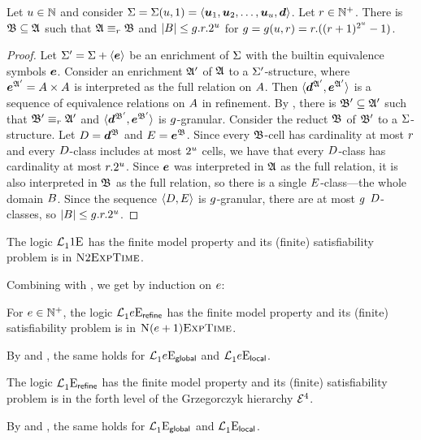 \begin{remark}\label{rem:monadic-1}
Let $u \in \mathbb{N}$ and consider $\mathrm{\Sigma} = \mathrm{\Sigma}(u,1) =
\left\langle \bm{u}_{1},\bm{u}_{2},\dots,\bm{u}_{u},\bm{d} \right\rangle$. Let $r \in \mathbb{N}^{+}$.
There is $\mathfrak{B} \subseteq \mathfrak{A}$ such that $\mathfrak{A} \equiv_{r} \mathfrak{B}$ and
$\left|B\right| \leq g.r.2^u$ for $g = g(u, r) =
r.((r+1)^{2^u}-1)$.
\end{remark}
\begin{proof}
Let $\mathrm{\Sigma'} = \mathrm{\Sigma} + \left\langle \bm{e} \right\rangle$ be an enrichment of $\mathrm{\Sigma}$ with the builtin
equivalence symbols $\bm{e}$. Consider an enrichment $\mathfrak{A'}$ of $\mathfrak{A}$ to a
$\mathrm{\Sigma'}$-structure, where $\bm{e}^{\mathfrak{A'}} = {A\times A}$ is interpreted as the
full relation on $A$. Then $\langle \bm{d}^{\mathfrak{A'}}, \bm{e}^{\mathfrak{A'}} \rangle$ is a
sequence of equivalence relations on $A$ in refinement.
By , there is $\mathfrak{B'} \subseteq \mathfrak{A'}$ such that
$\mathfrak{B'} \equiv_{r} \mathfrak{A'}$ and $\langle \bm{d}^{\mathfrak{B'}},\bm{e}^{\mathfrak{B'}} \rangle$ is
$g$-granular.
Consider the reduct $\mathfrak{B}$ of $\mathfrak{B'}$ to a
$\mathrm{\Sigma}$-structure. Let $D = \bm{d}^{\mathfrak{B}}$ and $E = \bm{e}^{\mathfrak{B}}$.
Since every $\mathfrak{B}$-cell has
cardinality at most $r$ and every $D$-class includes at most $2^u$
cells, we have that every $D$-class has cardinality at most $r.2^u$.
Since $\bm{e}$ was interpreted in $\mathfrak{A}$ as the full relation, it is also
interpreted in $\mathfrak{B}$ as the full relation, so there is a single
$E$-class---the whole domain $B$.
Since the sequence $\left\langle D, E \right\rangle$ is $g$-granular, there are at most
$g$ $D$-classes, so $\left|B\right| \leq g.r.2^u$.
\end{proof}

\begin{corollary}\label{cor:monadic-base}
The logic $\mathcal{L}^{{}}_{1}{1}\mathrm{E}_{{}}$ has the finite model property and its
(finite) satisfiability problem is in $\text{\normalfont{\scshape N}}2\text{\normalfont{\scshape ExpTime}}$.
\end{corollary}

Combining  with , we get by
induction on $e$:
\begin{proposition}\label{prop:mon-in}
For $e \in \mathbb{N}^{+}$, the logic $\mathcal{L}^{{}}_{1}{e}\mathrm{E}_{\mathsf{refine}}$ has the finite
model property and its (finite) satisfiability problem is in
$\text{\normalfont{\scshape N}}(e+1)\text{\normalfont{\scshape ExpTime}}$.

By  and , the same
holds for $\mathcal{L}^{{}}_{1}{e}\mathrm{E}_{\mathsf{global}}$ and $\mathcal{L}^{{}}_{1}{e}\mathrm{E}_{\mathsf{local}}$.
\end{proposition}
\begin{proposition}
The logic $\mathcal{L}^{{}}_{1}{{}}\mathrm{E}_{\mathsf{refine}}$ has the finite
model property and its (finite) satisfiability problem is in the forth level of
the Grzegorczyk hierarchy $\mathcal{E}^{4}$.

By  and , the same holds
for $\mathcal{L}^{{}}_{1}{{}}\mathrm{E}_{\mathsf{global}}$ and $\mathcal{L}^{{}}_{1}{{}}\mathrm{E}_{\mathsf{local}}$.
\end{proposition}

